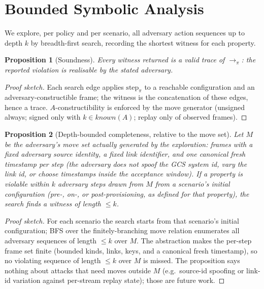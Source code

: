 \documentclass[conference]{IEEEtran}
\newtheorem{proposition}{Proposition}
\begin{document}
\section{Bounded Symbolic Analysis}
\label{sec:analysis}

We explore, per policy and per scenario, all adversary action sequences up to
depth $k$ by breadth-first search, recording the shortest witness for each
property.

\begin{proposition}[Soundness]
Every witness returned is a valid trace of $\xrightarrow{}_\pi$: the reported
violation is realisable by the stated adversary.
\end{proposition}
\begin{proof}[Proof sketch]
Each search edge applies $\mathrm{step}_\pi$ to a reachable configuration and an
adversary-constructible frame; the witness is the concatenation of these edges,
hence a trace. $A$-constructibility is enforced by the move generator
(unsigned always; signed only with $k\in\mathit{known}(A)$; replay only of
observed frames). \end{proof}

\begin{proposition}[Depth-bounded completeness, relative to the move set]
Let $M$ be the adversary's move set actually generated by the exploration: frames
with a fixed adversary source identity, a fixed link identifier, and one canonical
fresh timestamp per step (the adversary does not spoof the GCS system id, vary the
link id, or choose timestamps inside the acceptance window). If a property is
violable within $k$ adversary steps \emph{drawn from $M$} from a scenario's initial
configuration (pre-, on-, or post-provisioning, as defined for that property),
the search finds a witness of length $\le k$.
\end{proposition}
\begin{proof}[Proof sketch]
For each scenario the search starts from that scenario's initial configuration;
BFS over the finitely-branching move relation enumerates all adversary sequences
of length $\le k$ over $M$. The abstraction makes the per-step frame set finite
(bounded kinds, links, keys, and a canonical fresh timestamp), so no violating
sequence of length $\le k$ over $M$ is missed. The proposition says nothing about
attacks that need moves outside $M$ (e.g.\ source-id spoofing or link-id variation
against per-stream replay state); those are future work. \end{proof}
\end{document}
